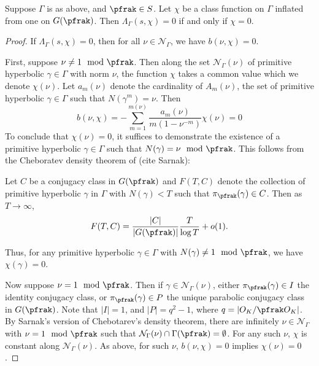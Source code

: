 \documentclass[11pt]{amsart}
\begin{document}
\begin{thm}
	Suppose $\Gamma$  is as above, and $\pfrak \in S$.
	Let $\chi$ be a class function on $\Gamma$ inflated from one on $G(\pfrak)$.
	Then $\Lambda_{\Gamma}(s,\chi)=0$ if and only if $\chi=0$.
\end{thm}
\begin{proof}
	If $\Lambda_{\Gamma}(s,\chi)=0$, then for all $\nu \in \mathcal{N}_{\Gamma}$, we have $b(\nu,\chi)=0$.

	First, suppose $\nu\neq 1 \mod \pfrak$.
	Then along the set $\mathcal{N}_{\Gamma}(\nu)$ of primitive hyperbolic $\gamma \in \Gamma$ with norm $\nu$, the function $\chi$ takes a common value which we denote $\chi(\nu)$.
	Let $a_{m}(\nu)$ denote the cardinality of $A_{m}(\nu)$, the set of primitive hyperbolic $\gamma \in \Gamma$ such that $N(\gamma^{m})=\nu$.
	Then
	\[
		b(\nu,\chi)=-\sum_{m=1}^{m(\nu)}\frac{a_{m}(\nu)}{m(1-\nu^{-m})}\chi(\nu)=0
	\]
	To conclude that $\chi(\nu)=0$, it suffices to demonstrate the existence of a primitive hyperbolic $\gamma \in \Gamma$ such that $N(\gamma)= \nu \mod \pfrak$.
	This follows from the Cheboratev density theorem of (cite Sarnak):

	\begin{thm}
		Let $C$ be a conjugacy class in $G(\pfrak)$ and $F(T,C)$ denote the collection of primitive hyperbolic $\gamma$ in $\Gamma$ with $N(\gamma)<T$ such that $\pi_{\pfrak}(\gamma) \in C$.
		Then as $T \to \infty$,
		\[F(T,C) = \frac{|C|}{|G(\pfrak)|} \frac{T}{\log T} +o(1).\]
	\end{thm}

	Thus, for any primitive hyperbolic $\gamma \in \Gamma$ with $N(\gamma)\neq 1 \mod \pfrak$, we have $\chi(\gamma)=0$.

	Now suppose $\nu =1 \mod \pfrak$.
	Then if $\gamma \in \mathcal{N}_{\Gamma}(\nu)$, either $\pi_{\pfrak}(\gamma) \in I$ the identity conjugacy class, or $\pi_{\pfrak}(\gamma) \in P$ the unique parabolic conjugacy class in $G(\pfrak)$.
	Note that $|I|=1$, and $|P|=q^{2}-1$, where $q= |O_{K}/\pfrak O_{K}|$.
	By Sarnak's version of Chebotarev's density theorem, there are infinitely $\nu \in \mathcal{N}_{\Gamma}$  with $\nu=1 \mod \pfrak$ such that $\mathcal{N}_{\Gamma}(\nu)\cap \Gamma(\pfrak) =\emptyset$.
	For any such $\nu$, $\chi$ is constant along $\mathcal{N}_{\Gamma}(\nu)$.
	As above, for such $\nu$, $b(\nu,\chi)=0$ implies $\chi(\nu)=0$.

\end{proof}





{}

\end{document}
